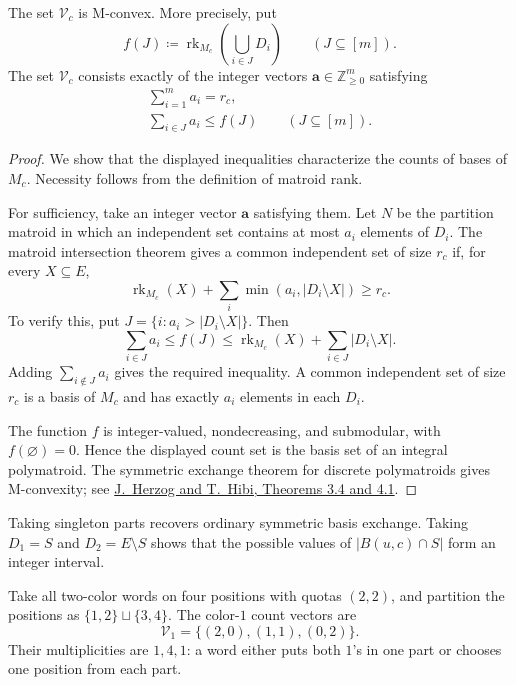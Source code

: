 \begin{theorem}
The set $\mathcal V_c$ is M-convex. More precisely, put
\[
 f(J)\coloneqq\operatorname{rk}_{M_c}
 \left(\bigcup_{i\in J}D_i\right)
 \qquad(J\subseteq[m]).
\]
The set $\mathcal V_c$ consists exactly of the integer vectors
$\mathbf a\in\mathbb Z_{\geq0}^m$ satisfying
\[
 \begin{gathered}
 \sum_{i=1}^m a_i=r_c,\\
 \sum_{i\in J}a_i\leq f(J)\qquad(J\subseteq[m]).
 \end{gathered}
\]
\end{theorem}

\begin{proof}
We show that the displayed inequalities characterize the counts of bases
of $M_c$. Necessity follows from the definition of matroid rank.

For sufficiency, take an integer vector $\mathbf a$ satisfying them.
Let $N$ be the partition matroid in which an independent set contains at
most $a_i$ elements of $D_i$. The matroid intersection theorem
\cite{Oxley2011} gives a common independent set of size $r_c$ if,
for every $X\subseteq E$,
\[
 \operatorname{rk}_{M_c}(X)+
 \sum_i\min(a_i,|D_i\setminus X|)\geq r_c.
\]
To verify this, put $J=\{i:a_i>|D_i\setminus X|\}$. Then
\[
 \sum_{i\in J}a_i\leq f(J)
 \leq\operatorname{rk}_{M_c}(X)+\sum_{i\in J}|D_i\setminus X|.
\]
Adding $\sum_{i\notin J}a_i$ gives the required inequality.
A common independent set of size $r_c$ is a basis of $M_c$ and has
exactly $a_i$ elements in each $D_i$.

The function $f$ is integer-valued, nondecreasing, and submodular, with
$f(\varnothing)=0$. Hence the displayed count set is the basis set of
an integral polymatroid. The symmetric exchange theorem for discrete
polymatroids gives M-convexity; see
\href{https://arxiv.org/html/math/0307236v1}{J.~Herzog and T.~Hibi,
Theorems 3.4 and 4.1}.
\end{proof}

Taking singleton parts recovers ordinary symmetric basis exchange.
Taking $D_1=S$ and $D_2=E\setminus S$ shows that the possible values of
$|B(u,c)\cap S|$ form an integer interval.

\begin{example}
Take all two-color words on four positions with quotas $(2,2)$, and
partition the positions as $\{1,2\}\sqcup\{3,4\}$. The color-$1$
count vectors are
\[
 \mathcal V_1=\{(2,0),(1,1),(0,2)\}.
\]
Their multiplicities are $1,4,1$: a word either puts both $1$'s in
one part or chooses one position from each part.
\end{example}

